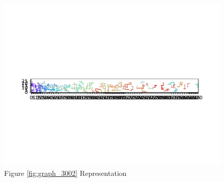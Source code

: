 \documentclass{standalone}
\begin{document}
\begin{figure}[!htb]
	\caption{Figure \ref{fig:graph_3002} Representation}
	\label{fig:picture_3002}
	\includegraphics[width=\textwidth]{../graphs/picture/3002.pdf}
\end{figure}
\end{document}
